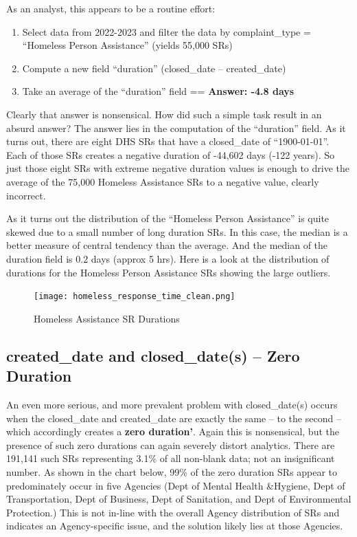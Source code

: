 \documentclass[12pt, titlepage]{article}
\begin{document}
		As an analyst, this appears to be a routine effort: 
		
		\begin{enumerate}
		    \item Select data from 2022-2023 and filter the data by complaint\_type = ``Homeless Person Assistance'' (yields 55,000 SRs)
		    \item Compute a new field ``duration'' (closed\_date – created\_date)
		    \item Take an average of the ``duration'' field == \textbf{Answer:  -4.8 days}  
		\end{enumerate}
		
		Clearly that answer is nonsensical. How did such a simple task result in an absurd answer? The answer lies in the computation of the
		``duration'' field. As it turns out, there are eight DHS SRs that have a closed\_date of ``1900-01-01''. Each of those SRs creates a 
		negative duration of -44,602 days (-122 years). So just those eight SRs with extreme negative duration values is enough to drive
		the average of the 75,000 Homeless Assistance SRs to a negative value, clearly incorrect.
		
		As it turns out the distribution of the ``Homeless Person Assistance'' is quite skewed due to a small number of long duration
		SRs. In this case, the median is a better measure of central tendency than the average. And the median of the duration
		field is  0.2 days (approx 5 hrs). Here is a look at the distribution of durations for the Homeless Person Assistance SRs showing
		the large outliers. 
		
		\begin{figure}[H]
		 	 \centering
			  \texttt{[image: homeless\_response\_time\_clean.png]}
			  \caption{Homeless Assistance SR Durations}
			  \label{fig:homeless}
		\end{figure}
		
	\subsection{created\_date and closed\_date(s) --  Zero Duration}		
	An even more serious, and more prevalent problem with closed\_date(s) occurs when the closed\_date and created\_date
	are exactly the same -- to the second -- which accordingly creates a \textbf{zero duration'}. Again this is nonsensical, but the
	presence of such zero durations can again severely distort analytics. There are 191,141 such SRs representing 3.1\% of all 
	non-blank data; not an insignificant number. As shown in the chart below, 99\% of the zero duration SRs appear to predominately
	occur in five Agencies (Dept of Mental Health \&Hygiene, Dept of Transportation, Dept of Business, Dept of Sanitation,
	and Dept of Environmental Protection.) This is not in-line with the overall Agency distribution of SRs and indicates an
	Agency-specific issue, and the solution likely lies at those Agencies.
	
\end{document}
